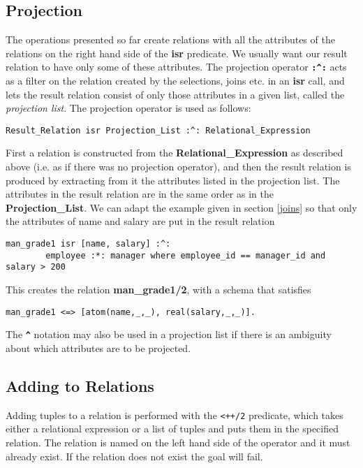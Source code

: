 \subsection{Projection}
 \index{$:\verb-^-:$}
The operations presented so far create relations with all the attributes
of the relations on the right hand side of the {\bf isr} 
predicate. We usually want our result relation to have only some of
these attributes. The projection operator {\bf \verb-:^:-} acts as a filter
on the relation created by the selections, joins etc. in an {\bf isr}
call, and lets the result relation consist of only those attributes
in a given list, called the {\em projection list}. The projection
operator is used as follows:
\begin{verbatim}
Result_Relation isr Projection_List :^: Relational_Expression
\end{verbatim}

First a relation is constructed from the {\bf Relational\_Expression} as 
described above (i.e. as if there 
was no projection operator), and then the result relation 
is produced by extracting from it the attributes listed in the projection list.
The attributes in the result relation are in the same order as in the
{\bf Projection\_List}. 
We can adapt the example given in section \ref{joins} so that
only the attributes of name and salary are put in the result relation
\begin{verbatim}
man_grade1 isr [name, salary] :^: 
        employee :*: manager where employee_id == manager_id and salary > 200
\end{verbatim}
This creates the relation {\bf man\_grade1/2}, with a schema that satisfies 
\begin{verbatim}
man_grade1 <=> [atom(name,_,_), real(salary,_,_)].
\end{verbatim}


The {\bf \verb-^-} notation may also be used in a projection list if there
is an ambiguity about which attributes are to be projected.


\subsection{Adding to Relations}
\label{insertion into rels}
 
Adding tuples to a relation is performed with the \verb-<++/2- predicate,
which takes either a relational expression or a list of tuples and puts them
in the specified relation.
The relation is named on the left hand side of the operator and it
must already exist. If the relation does not exist the goal will fail.

